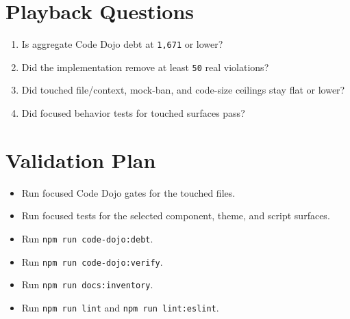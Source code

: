 \section{Playback Questions}\label{record-223-playback-questions}

\begin{enumerate}
\def\labelenumi{\arabic{enumi}.}
\tightlist
\item
  Is aggregate Code Dojo debt at \texttt{1\allowbreak{},\allowbreak{}6\allowbreak{}7\allowbreak{}1} or lower?
\item
  Did the implementation remove at least \texttt{5\allowbreak{}0} real violations?
\item
  Did touched file/context, mock-ban, and code-size ceilings stay flat or lower?
\item
  Did focused behavior tests for touched surfaces pass?
\end{enumerate}

\section{Validation Plan}\label{record-223-validation-plan}

\begin{itemize}
\tightlist
\item
  Run focused Code Dojo gates for the touched files.
\item
  Run focused tests for the selected component, theme, and script surfaces.
\item
  Run \texttt{n\allowbreak{}p\allowbreak{}m\allowbreak{} \allowbreak{}r\allowbreak{}u\allowbreak{}n\allowbreak{} \allowbreak{}c\allowbreak{}o\allowbreak{}d\allowbreak{}e\allowbreak{}-\allowbreak{}d\allowbreak{}o\allowbreak{}j\allowbreak{}o\allowbreak{}:\allowbreak{}d\allowbreak{}e\allowbreak{}b\allowbreak{}t}.
\item
  Run \texttt{n\allowbreak{}p\allowbreak{}m\allowbreak{} \allowbreak{}r\allowbreak{}u\allowbreak{}n\allowbreak{} \allowbreak{}c\allowbreak{}o\allowbreak{}d\allowbreak{}e\allowbreak{}-\allowbreak{}d\allowbreak{}o\allowbreak{}j\allowbreak{}o\allowbreak{}:\allowbreak{}v\allowbreak{}e\allowbreak{}r\allowbreak{}i\allowbreak{}f\allowbreak{}y}.
\item
  Run \texttt{n\allowbreak{}p\allowbreak{}m\allowbreak{} \allowbreak{}r\allowbreak{}u\allowbreak{}n\allowbreak{} \allowbreak{}d\allowbreak{}o\allowbreak{}c\allowbreak{}s\allowbreak{}:\allowbreak{}i\allowbreak{}n\allowbreak{}v\allowbreak{}e\allowbreak{}n\allowbreak{}t\allowbreak{}o\allowbreak{}r\allowbreak{}y}.
\item
  Run \texttt{n\allowbreak{}p\allowbreak{}m\allowbreak{} \allowbreak{}r\allowbreak{}u\allowbreak{}n\allowbreak{} \allowbreak{}l\allowbreak{}i\allowbreak{}n\allowbreak{}t} and \texttt{n\allowbreak{}p\allowbreak{}m\allowbreak{} \allowbreak{}r\allowbreak{}u\allowbreak{}n\allowbreak{} \allowbreak{}l\allowbreak{}i\allowbreak{}n\allowbreak{}t\allowbreak{}:\allowbreak{}e\allowbreak{}s\allowbreak{}l\allowbreak{}i\allowbreak{}n\allowbreak{}t}.
\end{itemize}

